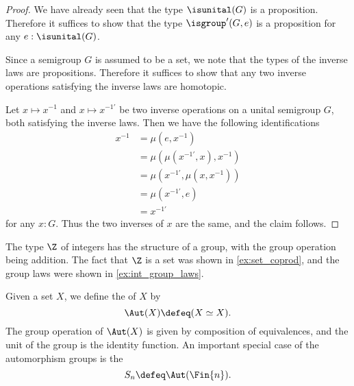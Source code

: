 \begin{proof}
  We have already seen that the type $\isunital(G)$ is a proposition. Therefore it suffices to show that the type $\isgroup'(G,e)$ is a proposition for any $e:\isunital(G)$.

  Since a semigroup $G$ is assumed to be a set, we note that the types of the inverse laws are propositions. Therefore it suffices to show that any two inverse operations satisfying the inverse laws are homotopic.

  Let $x\mapsto x^{-1}$ and $x\mapsto x^{-1'}$ be two inverse operations on a unital semigroup $G$, both satisfying the inverse laws. Then we have the following identifications
  \begin{align*}
    x^{-1} & = \mu(e,x^{-1}) \\
    & = \mu(\mu(x^{-1'},x),x^{-1}) \\
    & = \mu(x^{-1'},\mu(x,x^{-1})) \\
    & = \mu(x^{-1'},e) \\
    & = x^{-1'}
  \end{align*}
  for any $x:G$. Thus the two inverses of $x$ are the same, and the claim follows.
\end{proof}

\begin{eg}
  The type $\Z$ of integers has the structure of a group, with the group operation being addition. The fact that $\Z$ is a set was shown in \cref{ex:set_coprod}, and the group laws were shown in \cref{ex:int_group_laws}. 
\end{eg}

\begin{eg}
  Given a set $X$, we define  the  of $X$ by
  \begin{equation*}
    \Aut(X)\defeq (X\simeq X).
  \end{equation*}
  The group operation of $\Aut(X)$ is given by composition of equivalences, and the unit of the group is the identity function. An important special case of the automorphism groups is the 
  \begin{equation*}
    S_n\defeq \Aut(\Fin{n}).
  \end{equation*}
\end{eg}

